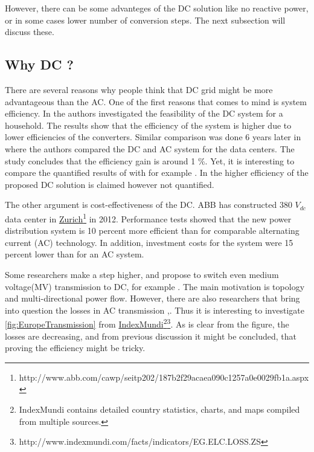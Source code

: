 \documentclass[]{scrartcl}
\begin{document}
However, there can be some advanteges of the DC solution like no reactive power, or in some cases lower number of conversion steps.  The next subsection will discuss these.

\subsection{Why DC ? }
There are several reasons why people think that DC grid might be more advantageous than the AC. One of the first reasons that comes to mind is system efficiency. In \cite{Engelen2006a}  the authors investigated the feasibility of the DC system for a household. The results show that the efficiency of the system is higher due to lower efficiencies of the converters. Similar comparison was done 6 years later in \cite{Paper2012} where the authors compared the DC and AC system for the data centers. The study concludes that the efficiency gain is around 1 \%. Yet, it is interesting to compare the quantified results of \cite{Paper2012} with for example \cite{Mondal2012}. In \cite{Mondal2012} the higher efficiency of the proposed DC solution is claimed however not quantified. 

The other argument is cost-effectiveness of the DC. ABB has constructed 380 $V_{dc}$ data center in \href{<http://www.abb.com/cawp/seitp202/187b2f29acaea090c1257a0e0029fb1a.aspx>}{Zurich}\footnote{http://www.abb.com/cawp/seitp202/187b2f29acaea090c1257a0e0029fb1a.aspx} in 2012. Performance tests showed that the new power distribution system is 10 percent more efficient than for comparable alternating current (AC) technology. In addition, investment costs for the system were 15 percent lower than for an AC system.

Some researchers make a step higher, and propose to switch even medium voltage(MV) transmission to DC, for example \cite{Doncker2014}. The main motivation is topology and multi-directional power flow. However, there are also researchers that bring into question the losses in AC transmission \cite{Dragicevic2015},\cite{Dragicevic2014}. Thus it is interesting to investigate \ref{fig:EuropeTransmission} from \href{<http://www.indexmundi.com/facts/indicators/EG.ELC.LOSS.ZS>}{IndexMundi}\footnote{IndexMundi contains detailed country statistics, charts, and maps compiled from multiple sources.}\footnote{http://www.indexmundi.com/facts/indicators/EG.ELC.LOSS.ZS}. As is clear from the figure, the losses are decreasing, and from previous discussion it might be concluded, that proving the efficiency might be tricky.
\end{document}
